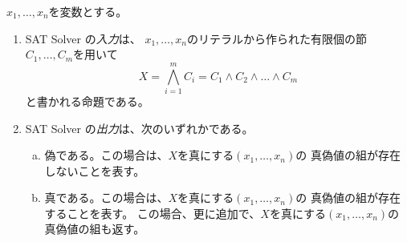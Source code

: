 \begin{defn}
 $x_1, \dots, x_n$を変数とする。
 \begin{enumerate}[1.]
  \item SAT Solver の\emph{入力}は、
        $x_1, \dots, x_n$のリテラルから作られた有限個の節
        $C_1, \dots, C_m$を用いて
        \[
        X = \bigwedge_{i=1}^m C_i = C_1 \land C_2 \land \dots \land C_m
        \]
        と書かれる命題である。
  \item SAT Solver の\emph{出力}は、次のいずれかである。
        \begin{enumerate}[(a)]
         \item 偽である。この場合は、$X$を真にする$(x_1, \dots, x_n)$の
               真偽値の組が存在しないことを表す。
         \item 真である。この場合は、$X$を真にする$(x_1, \dots, x_n)$の
               真偽値の組が存在することを表す。
               この場合、更に追加で、$X$を真にする$(x_1, \dots, x_n)$の
               真偽値の組も返す。
        \end{enumerate} 
 \end{enumerate}
\end{defn}

